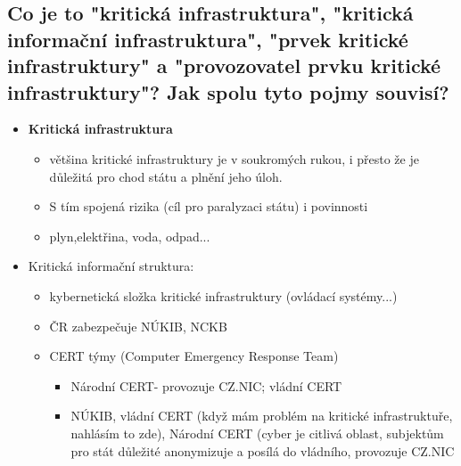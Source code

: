 \subsection{Co je to "kritická infrastruktura", "kritická informační infrastruktura", "prvek kritické infrastruktury" a "provozovatel prvku kritické infrastruktury"? Jak spolu tyto pojmy souvisí?}
\begin{itemize}
    \item \textbf{Kritická infrastruktura}
          \begin{itemize}
              \item většina kritické infrastruktury je v soukromých rukou, i přesto že je důležitá pro chod státu a plnění jeho úloh.
              \item S tím spojená rizika (cíl pro paralyzaci státu) i povinnosti
              \item plyn,elektřina, voda, odpad...
          \end{itemize}
    \item Kritická informační struktura:
          \begin{itemize}
              \item kybernetická složka kritické infrastruktury (ovládací systémy...)
              \item ČR zabezpečuje NÚKIB, NCKB
              \item CERT týmy (Computer Emergency Response Team)
                    \begin{itemize}
                        \item Národní CERT- provozuje CZ.NIC; vládní CERT
                        \item NÚKIB, vládní CERT (když mám problém na kritické infrastruktuře, nahlásím to zde), Národní CERT
                              (cyber je citlivá oblast, subjektům pro stát důležité anonymizuje a posílá do vládního, provozuje
                              CZ.NIC
                    \end{itemize}
          \end{itemize}
\end{itemize}


